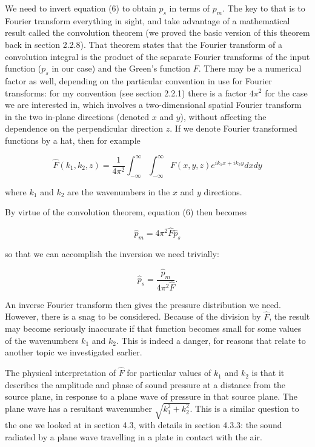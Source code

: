   We need to invert equation (6) to obtain $p_s$ in terms of $p_m$. The key to 
  that is to Fourier transform everything in sight, and take advantage of a 
  mathematical result called the convolution theorem (we proved the basic 
  version of this theorem back in section 2.2.8). That theorem states that the 
  Fourier transform of a convolution integral is the product of the separate 
  Fourier transforms of the input function ($p_s$ in our case) and the Green's 
  function $F$. There may be a numerical factor as well, depending on the 
  particular convention in use for Fourier transforms: for my convention (see 
  section 2.2.1) there is a factor $4 \pi^2$ for the case we are interested in, 
  which involves a two-dimensional spatial Fourier transform in the two 
  in-plane directions (denoted $x$ and $y$), without affecting the dependence 
  on the perpendicular direction $z$. If we denote Fourier transformed 
  functions by a hat, then for example 

  $$\hat{F}(k_1,k_2,z)=\dfrac{1}{4 
  \pi^2}\int_{-\infty}^\infty{\int_{-\infty}^\infty{F(x,y,z)e^{i k_1 x+ik_2 y} 
  dx}dy} \tag{7}$$ 

  where $k_1$ and $k_2$ are the wavenumbers in the $x$ and $y$ directions. 

  By virtue of the convolution theorem, equation (6) then becomes 

  $$\hat{p}_m=4 \pi^2 \hat{F} \hat{p}_s \tag{8}$$ 

  so that we can accomplish the inversion we need trivially: 

  $$\hat{p}_s=\dfrac{\hat{p}_m }{4 \pi^2 \hat{F}} . \tag{9}$$ 

  An inverse Fourier transform then gives the pressure distribution we need. 
  However, there is a snag to be considered. Because of the division by 
  $\hat{F}$, the result may become seriously inaccurate if that function 
  becomes small for some values of the wavenumbers $k_1$ and $k_2$. This is 
  indeed a danger, for reasons that relate to another topic we investigated 
  earlier. 

  The physical interpretation of $\hat{F}$ for particular values of $k_1$ and 
  $k_2$ is that it describes the amplitude and phase of sound pressure at a 
  distance from the source plane, in response to a plane wave of pressure in 
  that source plane. The plane wave has a resultant wavenumber 
  $\sqrt{k_1^2+k_2^2}$. This is a similar question to the one we looked at in 
  section 4.3, with details in section 4.3.3: the sound radiated by a plane 
  wave travelling in a plate in contact with the air. 

